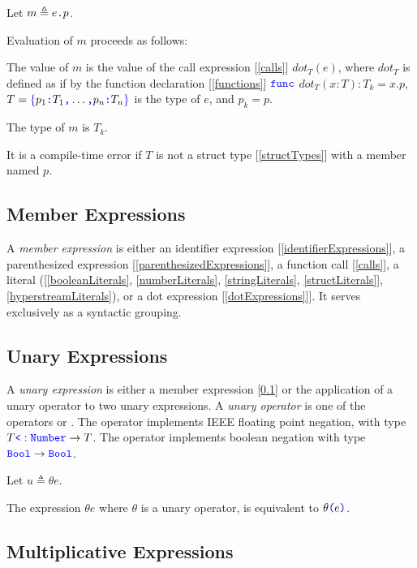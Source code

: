 \documentclass{article}
\begin{document}
Let $m \triangleq e\texttt{\color{blue} .}{}p$.

Evaluation of $m$ proceeds as follows:

The value of $m$ is the value of the call expression [\ref{calls}] $dot_T(e)$, where $dot_T$ is defined as if by the function declaration  [\ref{functions}] $\texttt{\color{blue} func}{}$ $dot_T(x: T): T_k = x.p$,  $T = \texttt{\color{blue} $\{$}{}p_1\texttt{\color{blue} :}{} T_1\texttt{\color{blue} ,}{} \ldots\texttt{\color{blue} ,}{} p_n\texttt{\color{blue} :}{} T_n\texttt{\color{blue} $\}$}$ is the type of $e$, and $p_k = p$.

The type of $m$ is $T_k$. 

It is a compile-time error if $T$ is not a struct type [\ref{structTypes}] with a member named $p$. 

\subsection{Member Expressions}
\label{memberExpression}

A {\em member expression} is either an identifier expression [\ref{identifierExpressions}], a parenthesized expression [\ref{parenthesizedExpressions}], a function call [\ref{calls}], a literal ([\ref{booleanLiterals}, \ref{numberLiterals}, \ref{stringLiterals}, \ref{structLiterals}], \ref{hyperstreamLiterals}), or a dot expression [\ref{dotExpressions}]]. It serves exclusively as a syntactic grouping.


\subsection{Unary Expressions}
\label{unaryExpressions}

A {\em unary expression} is either a member expression [\ref{memberExpression}] or the application of a unary operator to two unary expressions.
A {\em unary operator} is one of the operators \MINUS{} or  \NOT{}. The \MINUS{} operator implements IEEE floating point negation, with type $T \texttt{\color{blue} \tt<}: \texttt{\color{blue} Number}{} \to T$. The \NOT{} operator implements boolean negation with type $\texttt{\color{blue} Bool}{} \to \texttt{\color{blue} Bool}$.

\UnaryExpression{}

Let $u \triangleq \theta{} e$.

The expression $\theta e$ where $\theta$ is a unary operator, is equivalent to $\theta\texttt{\color{blue} (}{}e\texttt{\color{blue} )}{}$.

\subsection{Multiplicative Expressions}
\label{multiplicativeExpressions}
\end{document}
